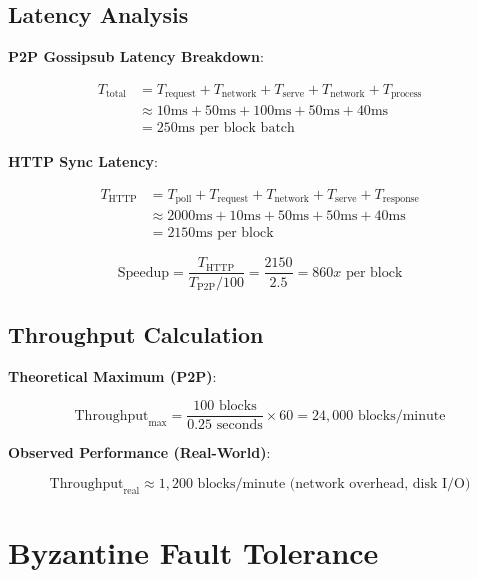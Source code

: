 \documentclass[11pt,a4paper]{article}
\begin{document}
\subsection{Latency Analysis}

\textbf{P2P Gossipsub Latency Breakdown}:

\begin{align}
T_{\text{total}} &= T_{\text{request}} + T_{\text{network}} + T_{\text{serve}} + T_{\text{network}} + T_{\text{process}} \\
&\approx 10\text{ms} + 50\text{ms} + 100\text{ms} + 50\text{ms} + 40\text{ms} \\
&= 250\text{ms per block batch}
\end{align}

\textbf{HTTP Sync Latency}:

\begin{align}
T_{\text{HTTP}} &= T_{\text{poll}} + T_{\text{request}} + T_{\text{network}} + T_{\text{serve}} + T_{\text{response}} \\
&\approx 2000\text{ms} + 10\text{ms} + 50\text{ms} + 50\text{ms} + 40\text{ms} \\
&= 2150\text{ms per block}
\end{align}

\begin{equation}
\text{Speedup} = \frac{T_{\text{HTTP}}}{T_{\text{P2P}}/100} = \frac{2150}{2.5} = 860x \text{ per block}
\end{equation}

\subsection{Throughput Calculation}

\textbf{Theoretical Maximum (P2P)}:

\begin{equation}
\text{Throughput}_{\text{max}} = \frac{100 \text{ blocks}}{0.25 \text{ seconds}} \times 60 = 24,000 \text{ blocks/minute}
\end{equation}

\textbf{Observed Performance (Real-World)}:

\begin{equation}
\text{Throughput}_{\text{real}} \approx 1,200 \text{ blocks/minute} \text{ (network overhead, disk I/O)}
\end{equation}

\section{Byzantine Fault Tolerance}
\end{document}
